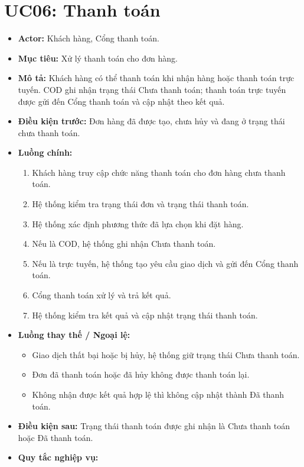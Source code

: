\section{UC06: Thanh toán}
\begin{itemize}
    \item \textbf{Actor:} Khách hàng, Cổng thanh toán.
    \item \textbf{Mục tiêu:} Xử lý thanh toán cho đơn hàng.
    \item \textbf{Mô tả:} Khách hàng có thể thanh toán khi nhận hàng hoặc thanh toán trực tuyến. COD ghi nhận trạng thái Chưa thanh toán; thanh toán trực tuyến được gửi đến Cổng thanh toán và cập nhật theo kết quả.
    \item \textbf{Điều kiện trước:} Đơn hàng đã được tạo, chưa hủy và đang ở trạng thái chưa thanh toán.
    \item \textbf{Luồng chính:}
    \begin{enumerate}
        \item Khách hàng truy cập chức năng thanh toán cho đơn hàng chưa thanh toán.
        \item Hệ thống kiểm tra trạng thái đơn và trạng thái thanh toán.
        \item Hệ thống xác định phương thức đã lựa chọn khi đặt hàng.
        \item Nếu là COD, hệ thống ghi nhận Chưa thanh toán.
        \item Nếu là trực tuyến, hệ thống tạo yêu cầu giao dịch và gửi đến Cổng thanh toán.
        \item Cổng thanh toán xử lý và trả kết quả.
        \item Hệ thống kiểm tra kết quả và cập nhật trạng thái thanh toán.
    \end{enumerate}
    \item \textbf{Luồng thay thế / Ngoại lệ:}
    \begin{itemize}
        \item Giao dịch thất bại hoặc bị hủy, hệ thống giữ trạng thái Chưa thanh toán.
        \item Đơn đã thanh toán hoặc đã hủy không được thanh toán lại.
        \item Không nhận được kết quả hợp lệ thì không cập nhật thành Đã thanh toán.
    \end{itemize}
    \item \textbf{Điều kiện sau:} Trạng thái thanh toán được ghi nhận là Chưa thanh toán hoặc Đã thanh toán.
    \item \textbf{Quy tắc nghiệp vụ:}

\end{itemize}
